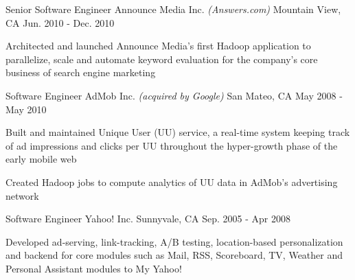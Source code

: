 \begin{cventries}
  \cventry
  {Senior Software Engineer} %
  {Announce Media Inc. \bodyfontlight\emph{(Answers.com)}} %
  {Mountain View, CA} %
  {Jun. 2010 - Dec. 2010} %
  {
    \begin{cvitems} %
      \item{Architected and launched Announce Media’s first Hadoop application to parallelize, scale and automate keyword evaluation for the company's core business of search engine marketing}
    \end{cvitems}
  }

  \cventry
  {Software Engineer} %
  {AdMob Inc. \bodyfontlight\emph{(acquired by Google)}} %
  {San Mateo, CA} %
  {May 2008 - May 2010} %
  {
    \begin{cvitems} %
      \item{Built and maintained Unique User (UU) service, a real-time system keeping track of ad impressions and clicks per UU throughout the hyper-growth phase of the early mobile web}
      \item{Created Hadoop jobs to compute analytics of UU data in AdMob's advertising network}
    \end{cvitems}
  }

  \cventry
  {Software Engineer} %
  {Yahoo! Inc.} %
  {Sunnyvale, CA} %
  {Sep. 2005 - Apr 2008} %
  {
    \begin{cvitems} %
      \item{Developed ad-serving, link-tracking, A/B testing, location-based personalization and backend for core modules such as Mail, RSS, Scoreboard, TV, Weather and Personal Assistant modules to My Yahoo!}
    \end{cvitems}
  }

\end{cventries}
